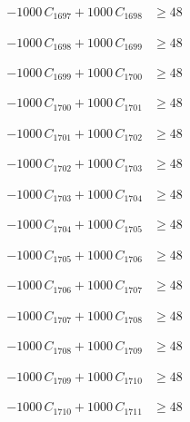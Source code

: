 \documentclass[a4paper,11pt]{article}
\begin{document}
\begin{align}
-1000\,C_{1697} + 1000\,C_{1698} &\geq 48 \nonumber
\end{align}

\begin{align}
-1000\,C_{1698} + 1000\,C_{1699} &\geq 48 \nonumber
\end{align}

\begin{align}
-1000\,C_{1699} + 1000\,C_{1700} &\geq 48 \nonumber
\end{align}

\begin{align}
-1000\,C_{1700} + 1000\,C_{1701} &\geq 48 \nonumber
\end{align}

\begin{align}
-1000\,C_{1701} + 1000\,C_{1702} &\geq 48 \nonumber
\end{align}

\begin{align}
-1000\,C_{1702} + 1000\,C_{1703} &\geq 48 \nonumber
\end{align}

\begin{align}
-1000\,C_{1703} + 1000\,C_{1704} &\geq 48 \nonumber
\end{align}

\begin{align}
-1000\,C_{1704} + 1000\,C_{1705} &\geq 48 \nonumber
\end{align}

\begin{align}
-1000\,C_{1705} + 1000\,C_{1706} &\geq 48 \nonumber
\end{align}

\begin{align}
-1000\,C_{1706} + 1000\,C_{1707} &\geq 48 \nonumber
\end{align}

\begin{align}
-1000\,C_{1707} + 1000\,C_{1708} &\geq 48 \nonumber
\end{align}

\begin{align}
-1000\,C_{1708} + 1000\,C_{1709} &\geq 48 \nonumber
\end{align}

\begin{align}
-1000\,C_{1709} + 1000\,C_{1710} &\geq 48 \nonumber
\end{align}

\begin{align}
-1000\,C_{1710} + 1000\,C_{1711} &\geq 48 \nonumber
\end{align}
\end{document}
